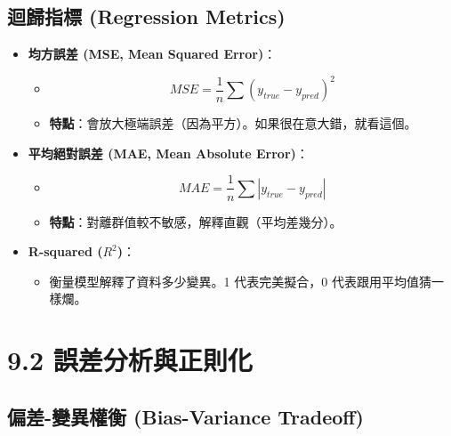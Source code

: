\documentclass[
  letterpaper,
  DIV=11,
  numbers=noendperiod]{scrreprt}
\providecommand{\tightlist}{%
  \setlength{\itemsep}{0pt}\setlength{\parskip}{0pt}}
\begin{document}
\section{迴歸指標 (Regression Metrics)}\label{sec-regression-metrics}

\begin{itemize}
\tightlist
\item
  \textbf{均方誤差 (MSE, Mean Squared Error)}：

  \begin{itemize}
  \tightlist
  \item
    \[ MSE = \frac{1}{n} \sum (y_{true} - y_{pred})^2 \]
  \item
    \textbf{特點}：會放大極端誤差（因為平方）。如果很在意大錯，就看這個。
  \end{itemize}
\item
  \textbf{平均絕對誤差 (MAE, Mean Absolute Error)}：

  \begin{itemize}
  \tightlist
  \item
    \[ MAE = \frac{1}{n} \sum |y_{true} - y_{pred}| \]
  \item
    \textbf{特點}：對離群值較不敏感，解釋直觀（平均差幾分）。
  \end{itemize}
\item
  \textbf{R-squared (\(R^2\))}：

  \begin{itemize}
  \tightlist
  \item
    衡量模型解釋了資料多少變異。1 代表完美擬合，0
    代表跟用平均值猜一樣爛。
  \end{itemize}
\end{itemize}

\chapter{9.2 誤差分析與正則化}\label{sec-error-analysis}

\section{偏差-變異權衡 (Bias-Variance
Tradeoff)}\label{sec-bias-variance}
\end{document}
